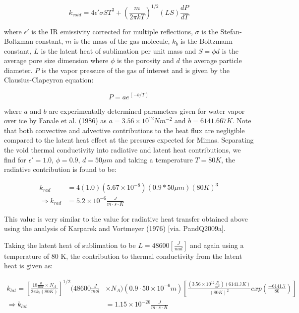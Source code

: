 \documentclass[11pt]{article} %
\begin{document}
	\begin{equation}
	k_{void} = 4 \epsilon' \sigma S T^{3} + ( \frac{m}{2 \pi k T})^{1/2}  (L S) \frac{dP}{dT}
	\end{equation}
	
	where $\epsilon'$ is the IR emissivity corrected for multiple reflections, $\sigma$ is the Stefan-Boltzman constant, $m$ is the mass of the gas molecule, $k_{b}$ is the Boltzmann constant, $L$ is the latent heat of sublimation per unit mass and $S = \phi d$ is the average pore size dimension where $\phi$ is the porosity and $d$ the average particle diameter. $P$ is the vapor pressure of the gas of interest and is given by the Clausius-Clapeyron equation:
	 
	 \begin{equation}
	 P = ae^{(-b/T)}
	 \end{equation}
	 
	 where $a$ and $b$ are experimentally determined parameters given for water vapor over ice by Fanale et al. (1986) as $a = 3.56 \times 10^{12} N m^{-2}$ and $b = 6141.667 K$. Note that both convective and advective contributions to the heat flux are negligible compared to the latent heat effect at the presures expected for Mimas. Separating the void thermal conductivity into radiative and latent heat contributions, we find for $\epsilon' = 1.0$, $\phi = 0.9$, $d = 50 \mu m$ and taking a temperature $T = 80 K$, the radiative contribution is found to be:
	 
	 \begin{equation}
	 \begin{split}
	 k_{rad} &= 4(1.0)(5.67\times 10^{-8})(0.9*50 \mu m)(80K)^{3} \\
	 \Rightarrow k_{rad} &= 5.2\times10^{-6} \frac{J}{m \cdot s \cdot K}
	 \end{split}
	 \end{equation}

	This value is very similar to the value for radiative heat transfer obtained above using the analysis of Karparek and Vortmeyer (1976) [via. PandQ2009a]. 
	
	Taking the latent heat of sublimation to be $L = 48600 [\frac{J}{mol}]$ and again using a temperature of 80 K, the contribution to thermal conductivity from the latent heat is given as:
	
	\begin{equation}
	\begin{split}
	k_{lat} = [ \frac{18 \frac{g}{mol} \times N_{A}}{2 \pi k_{b} (80K)} ]^{1/2} (48600 \frac{J}{mol} & \times N_{A})(0.9 \cdot 50\times10^{-6} m) [ \frac{(3.56\times 10^{12} \frac{N}{m^{2}})(6141.7 K)}{(80 K)^{2}} exp( \frac{-6141.7}{80} ) ] \\
	\Rightarrow k_{lat} &= 1.15\times10^{-26}\frac{J}{m \cdot s \cdot K}
	\end{split}
	\end{equation}
	
\end{document}
